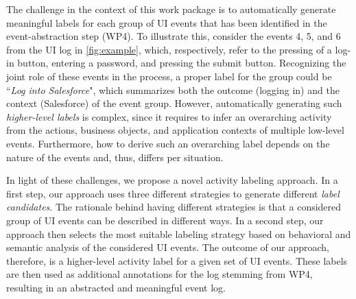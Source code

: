 The challenge in the context of this work package is to automatically generate meaningful labels for each group of UI events that has been identified in the event-abstraction step (WP4). To illustrate this, consider the events 4, 5, and 6 from the UI log in \autoref{fig:example}, which, respectively, refer to the pressing of a log-in button, entering a password, and pressing the submit button.
Recognizing the joint role of these events in the process, a proper label for the group could be ``\textit{Log into Salesforce}", which summarizes both the outcome (logging in) and the context (Salesforce) of the event group. 
However, automatically generating such \textit{higher-level labels} is complex, since it requires to infer an overarching activity from the actions, business objects, and application contexts of multiple low-level events. Furthermore, how to derive such an overarching label depends on the nature of the events and, thus, differs per situation. 

In light of these challenges, we propose a novel activity labeling approach. In a first step, our approach uses three different strategies to generate different \textit{label candidates}. The rationale behind having different strategies is that a considered group of UI events can be described in different ways. In a second step, our approach then selects the most suitable labeling strategy based on behavioral and semantic analysis of the considered UI events. The outcome of our approach, therefore, is a higher-level activity label for a given set of UI events.  These labels are then used as additional annotations for the log stemming from WP4, resulting in an abstracted and meaningful event log. 

